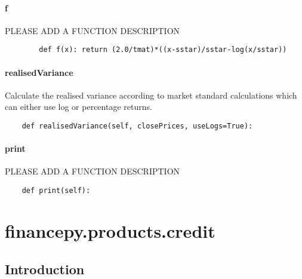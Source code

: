 \documentclass[twoside,11pt]{book}
\begin{document}
\subsubsection*{{\bf f}}
PLEASE ADD A FUNCTION DESCRIPTION

\begin{lstlisting}
        def f(x): return (2.0/tmat)*((x-sstar)/sstar-log(x/sstar))
\end{lstlisting}

\subsubsection*{{\bf realisedVariance}}
Calculate the realised variance according to market standard calculations which can either use log or percentage returns. 

\begin{lstlisting}
    def realisedVariance(self, closePrices, useLogs=True):
\end{lstlisting}

\subsubsection*{{\bf print}}
PLEASE ADD A FUNCTION DESCRIPTION

\begin{lstlisting}
    def print(self):
\end{lstlisting}


\chapter{financepy.products.credit}
\section{Introduction}
\end{document}
